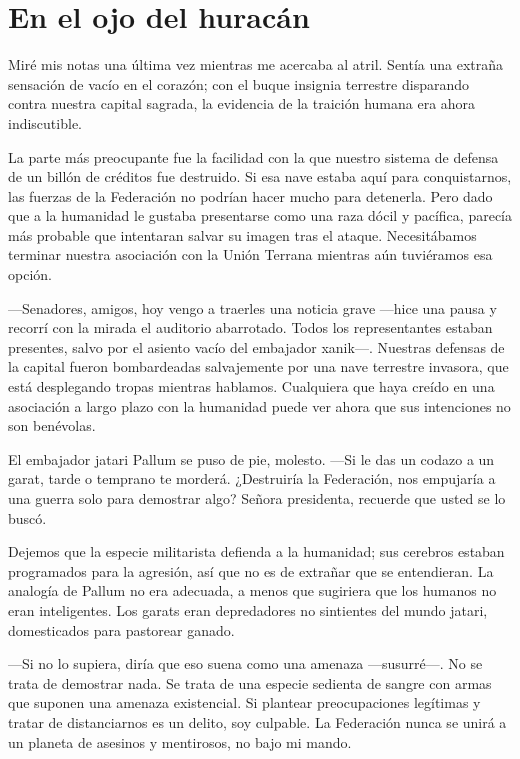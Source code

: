 \chapter{En el ojo del huracán}\label{sec:en-el-ojo-del-huracan}

Miré mis notas una última vez mientras me acercaba al atril. Sentía una extraña sensación de vacío en el corazón; con el buque insignia terrestre disparando contra nuestra capital sagrada, la evidencia de la traición humana era ahora indiscutible.

La parte más preocupante fue la facilidad con la que nuestro sistema de defensa de un billón de créditos fue destruido. Si esa nave estaba aquí para conquistarnos, las fuerzas de la Federación no podrían hacer mucho para detenerla. Pero dado que a la humanidad le gustaba presentarse como una raza dócil y pacífica, parecía más probable que intentaran salvar su imagen tras el ataque. Necesitábamos terminar nuestra asociación con la Unión Terrana mientras aún tuviéramos esa opción.

—Senadores, amigos, hoy vengo a traerles una noticia grave —hice una pausa y recorrí con la mirada el auditorio abarrotado. Todos los representantes estaban presentes, salvo por el asiento vacío del embajador xanik—. Nuestras defensas de la capital fueron bombardeadas salvajemente por una nave terrestre invasora, que está desplegando tropas mientras hablamos. Cualquiera que haya creído en una asociación a largo plazo con la humanidad puede ver ahora que sus intenciones no son benévolas.

El embajador jatari Pallum se puso de pie, molesto. —Si le das un codazo a un garat, tarde o temprano te morderá. ¿Destruiría la Federación, nos empujaría a una guerra solo para demostrar algo? Señora presidenta, recuerde que usted se lo buscó.

Dejemos que la especie militarista defienda a la humanidad; sus cerebros estaban programados para la agresión, así que no es de extrañar que se entendieran. La analogía de Pallum no era adecuada, a menos que sugiriera que los humanos no eran inteligentes. Los garats eran depredadores no sintientes del mundo jatari, domesticados para pastorear ganado.

—Si no lo supiera, diría que eso suena como una amenaza —susurré—. No se trata de demostrar nada. Se trata de una especie sedienta de sangre con armas que suponen una amenaza existencial. Si plantear preocupaciones legítimas y tratar de distanciarnos es un delito, soy culpable. La Federación nunca se unirá a un planeta de asesinos y mentirosos, no bajo mi mando.


